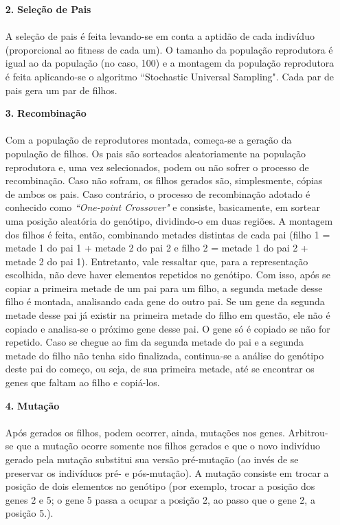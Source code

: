 \documentclass{report}
\begin{document}
\begin{itemize}
		\item[\textbf{2.}] \textbf{Seleção de Pais}
				
		\paragraph{} A seleção de pais é feita levando-se em conta a aptidão de cada indivíduo (proporcional ao fitness de cada um). O tamanho da população reprodutora é igual ao da população (no caso, 100) e a montagem da população reprodutora é feita aplicando-se o algoritmo ``Stochastic Universal Sampling". Cada par de pais gera um par de filhos.\\
		
		\item[\textbf{3.}] \textbf{Recombinação}
		
		\paragraph{} Com a população de reprodutores montada, começa-se a geração da população de filhos. Os pais são sorteados aleatoriamente na população reprodutora e, uma vez selecionados, podem ou não sofrer o processo de recombinação. Caso não sofram, os filhos gerados são, simplesmente, cópias de ambos os pais. Caso contrário, o processo de recombinação adotado é conhecido como \emph{``One-point Crossover"} e consiste, basicamente, em sortear uma posição aleatória do genótipo, dividindo-o em duas regiões. A montagem dos filhos é feita, então, combinando metades distintas de cada pai (filho 1 = metade 1 do pai 1 + metade 2 do pai 2 e filho 2 = metade 1 do pai 2 + metade 2 do pai 1). Entretanto, vale ressaltar que, para a representação escolhida, não deve haver elementos repetidos no genótipo. Com isso, após se copiar a primeira metade de um pai para um filho, a segunda metade desse filho é montada, analisando cada gene do outro pai. Se um gene da segunda metade desse pai já existir na primeira metade do filho em questão, ele não é copiado e analisa-se o próximo gene desse pai. O gene só é copiado se não for repetido. Caso se chegue ao fim da segunda metade do pai e a segunda metade do filho não tenha sido finalizada, continua-se a análise do genótipo deste pai do começo, ou seja, de sua primeira metade, até se encontrar os genes que faltam ao filho e copiá-los.\\
		
		\item[\textbf{4.}] \textbf{Mutação}
		
		\paragraph{} Após gerados os filhos, podem ocorrer, ainda, mutações nos genes. Arbitrou-se que a mutação ocorre somente nos filhos gerados e que o novo indivíduo gerado pela mutação substitui sua versão pré-mutação (ao invés de se preservar os indivíduos pré- e pós-mutação). A mutação consiste em trocar a posição de dois elementos no genótipo (por exemplo, trocar a posição dos genes 2 e 5; o gene 5 passa a ocupar a posição 2, ao passo que o gene 2, a posição 5.).\\
		

\end{itemize}
\end{document}
